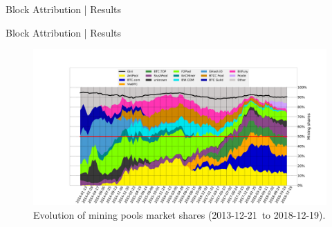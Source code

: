 \documentclass[10pt]{beamer}
\def\stackplotStart{2013-12-21}
\def\stackplotEnd{2018-12-19}
\begin{document}
\begin{frame}[fragile]{Block Attribution | Results}
    \setlength{\tabcolsep}{2pt}
    \begin{table}
        \caption{684 attribution conflicts out of 556400 blocks (0.0012\%). From 500,000 to 556,400, we attributed 96.5\% of the blocks (blockchain.info 92\%, $\sim$ 32,100 BTC difference)}\label{tbl:conflicts}
    \end{table}
\end{frame}

\begin{frame}[fragile]{Block Attribution | Results}
    \vspace*{-0.77cm}
    \begin{figure}
        \hspace*{-1.7cm}
        \includegraphics[width=1.23\textwidth]{images/stackplot_periodLen_2016secs_end_554399_numPeriods_138_threshold_4_groupBy_miner.pdf}
        \caption{Evolution of mining pools market shares (\stackplotStart~to \stackplotEnd).}
        \label{fig:stack_miners}
    \end{figure}
\end{frame}
\end{document}
